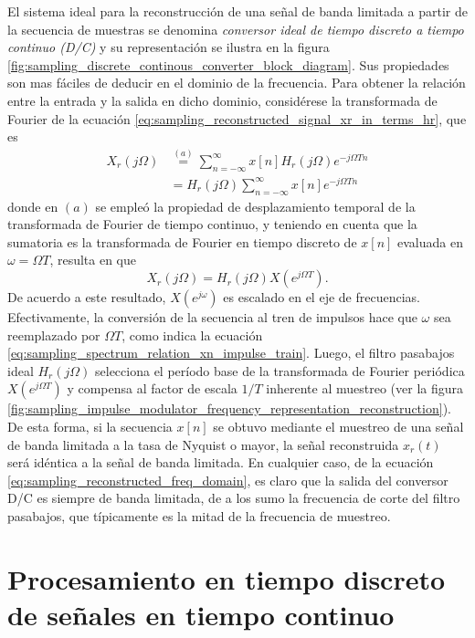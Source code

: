 \documentclass[a4paper]{report}
\begin{document}
El sistema ideal para la reconstrucción de una señal de banda limitada a partir de la secuencia de muestras se denomina \emph{conversor ideal de tiempo discreto a tiempo continuo (D/C)} y su representación se ilustra en la figura \ref{fig:sampling_discrete_continous_converter_block_diagram}. Sus propiedades son mas fáciles de deducir en el dominio de la frecuencia. Para obtener la relación entre la entrada y la salida en dicho dominio, considérese la transformada de Fourier de la ecuación \ref{eq:sampling_reconstructed_signal_xr_in_terms_hr}, que es
\begin{align*}
 X_r(j\Omega)&\overset{(a)}{=}\sum_{n=-\infty}^\infty x[n]H_r(j\Omega)e^{-j\Omega Tn}\\
   &=H_r(j\Omega)\sum_{n=-\infty}^\infty x[n]e^{-j\Omega Tn}
\end{align*}
donde en \((a)\) se empleó la propiedad de desplazamiento temporal de la transformada de Fourier de tiempo continuo, y teniendo en cuenta que la sumatoria es la transformada de Fourier en tiempo discreto de \(x[n]\) evaluada en \(\omega=\Omega T\), resulta en que 
\begin{equation}\label{eq:sampling_reconstructed_freq_domain}
 X_r(j\Omega)=H_r(j\Omega)X(e^{j\Omega T}). 
\end{equation}
De acuerdo a este resultado, \(X(e^{j\omega})\) es escalado en el eje de frecuencias. Efectivamente, la conversión de la secuencia al tren de impulsos hace que \(\omega\) sea reemplazado por \(\Omega T\), como indica la ecuación \ref{eq:sampling_spectrum_relation_xn_impulse_train}. Luego, el filtro pasabajos ideal \(H_r(j\Omega)\) selecciona el período base de la transformada de Fourier periódica \(X(e^{j\Omega T})\) y compensa al factor de escala \(1/T\) inherente al muestreo (ver la figura \ref{fig:sampling_impulse_modulator_frequency_representation_reconstruction}). De esta forma, si la secuencia \(x[n]\) se obtuvo mediante el muestreo de una señal de banda limitada a la tasa de Nyquist o mayor, la señal reconstruida \(x_r(t)\) será idéntica a la señal de banda limitada. En cualquier caso, de la ecuación   
\ref{eq:sampling_reconstructed_freq_domain}, es claro que la salida del conversor D/C es siempre de banda limitada, de a los sumo la frecuencia de corte del filtro pasabajos, que típicamente es la mitad de la frecuencia de muestreo.

\section{Procesamiento en tiempo discreto de señales en tiempo continuo}\label{sec:sampling_discrete_procesing_continuous_signals}
\end{document}
